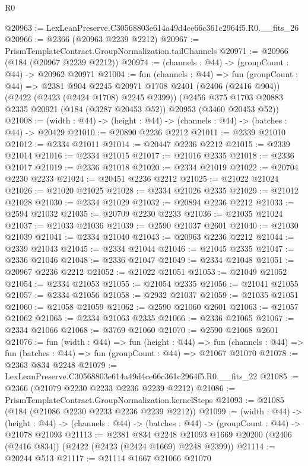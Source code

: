 \begin{lexlean}{R0}
\begin{coremodule}
@20963 := LexLeanPreserve.C30568803e614a49d4ce66c361c2964f5.R0.__fits_26
@20966 := @2366 (@20963 @2239 @2212)
@20967 := PrismTemplateContract.GroupNormalization.tailChannels
@20971 := @20966 (@184 (@20967 @2239 @2212))
@20974 := (channels : @44) -> (groupCount : @44) -> @20962 @20971
@21004 := fun (channels : @44) =>
  fun (groupCount : @44) =>
  @2381
    @904
    @2245
    @20971
    @1708
    @2401
    (@2406 (@2416 @904))
    (@2422 (@2423 (@2424 @1708) @2245 @2399))
    (@2456 @375 @1703 @20883 @2335 @20921 (@184 (@3287 @20453 @52)) @20953 (@3460 @20453 @52))
@21008 := (width : @44) -> (height : @44) -> (channels : @44) -> (batches : @44) -> @20429
@21010 := @20890 @2236 @2212
@21011 := @2339 @21010
@21012 := @2334 @21011
@21014 := @20447 @2236 @2212
@21015 := @2339 @21014
@21016 := @2334 @21015
@21017 := @21016 @2335
@21018 := @2336 @21017
@21019 := @2336 @21018
@21020 := @2334 @21019
@21022 := @20704 @2230 @2233
@21024 := @20451 @2236 @2212
@21025 := @21022 @21024
@21026 := @21020 @21025
@21028 := @2334 @21026 @2335
@21029 := @21012 @21028
@21030 := @2334 @21029
@21032 := @20894 @2236 @2212
@21033 := @2594 @21032
@21035 := @20709 @2230 @2233
@21036 := @21035 @21024
@21037 := @21033 @21036
@21039 := @2590 @21037 @2601
@21040 := @21030 @21039
@21041 := @2334 @21040
@21043 := @20963 @2236 @2212
@21044 := @2339 @21043
@21045 := @2334 @21044
@21046 := @21045 @2335
@21047 := @2336 @21046
@21048 := @2336 @21047
@21049 := @2334 @21048
@21051 := @20967 @2236 @2212
@21052 := @21022 @21051
@21053 := @21049 @21052
@21054 := @2334 @21053
@21055 := @21054 @2335
@21056 := @21041 @21055
@21057 := @2334 @21056
@21058 := @2932 @21037
@21059 := @21035 @21051
@21060 := @21058 @21059
@21062 := @2590 @21060 @2601
@21063 := @21057 @21062
@21065 := @2334 @21063 @2335
@21066 := @2336 @21065
@21067 := @2334 @21066
@21068 := @3769 @21060
@21070 := @2590 @21068 @2601
@21076 := fun (width : @44) =>
  fun (height : @44) =>
  fun (channels : @44) => fun (batches : @44) => fun (groupCount : @44) => @21067 @21070
@21078 := @2363 @834 @2248
@21079 := LexLeanPreserve.C30568803e614a49d4ce66c361c2964f5.R0.__fits_22
@21085 := @2366 (@21079 @2230 @2233 @2236 @2239 @2212)
@21086 := PrismTemplateContract.GroupNormalization.kernelSteps
@21093 := @21085 (@184 (@21086 @2230 @2233 @2236 @2239 @2212))
@21099 := (width : @44) ->
  (height : @44) -> (channels : @44) -> (batches : @44) -> (groupCount : @44) -> @21078 @21093
@21113 := @2381
    @834
    @2248
    @21093
    @1669
    @20200
    (@2406 (@2416 @834))
    (@2422 (@2423 (@2424 @1669) @2248 @2399))
@21114 := @20244 @513
@21117 := @21114 @1667 @21066 @21070

\end{coremodule}
\end{lexlean}
